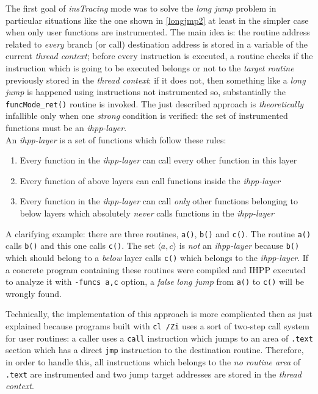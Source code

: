\documentclass[a4paper,10pt]{report}
\begin{document}
The first goal of \emph{insTracing} mode was to solve the \emph{long jump}
problem in particular situations like the one shown in \cref{longjmp2}
at least in the simpler case when only user functions are instrumented.
The main idea is: the routine address related to \emph{every} branch (or call)
destination address is stored in a variable of the current \emph{thread context};
before every instruction is executed, a routine checks if the instruction
which is going to be executed belongs or not to the \emph{target routine}
previously stored in the \emph{thread context}: if it does not, then something
like a \emph{long jump} is happened using instructions not instrumented so,
substantially the \verb|funcMode_ret()| routine is invoked. The just described
approach is \emph{theoretically} infallible only when one \emph{strong} condition
is verified: the set of instrumented functions must be an \emph{ihpp-layer}.\\
An \emph{ihpp-layer} is a set of functions which follow these rules:
\begin{enumerate}
\item Every function in the \emph{ihpp-layer} can call every other function in this layer
\item Every function of above layers can call functions inside the \emph{ihpp-layer}
\item Every function in the \emph{ihpp-layer} can call \emph{only} other functions
belonging to below layers which absolutely \emph{never} calls functions
in the \emph{ihpp-layer}
\end{enumerate}

\noindent
A clarifying example: there are three routines, \verb|a()|, \verb|b()| and \verb|c()|.
The routine \verb|a()| calls \verb|b()| and this one calls \verb|c()|.
The set $\langle a,c\rangle$ is \emph{not} an \emph{ihpp-layer} because \verb|b()| which should belong to a \emph{below} layer calls \verb|c()| which belongs to the \emph{ihpp-layer}. If a concrete program containing these routines were compiled and IHPP executed
to analyze it with \verb|-funcs a,c| option, a \emph{false} \emph{long jump} from
\verb|a()| to \verb|c()| will be wrongly found.

Technically, the implementation of this approach is more complicated then
as just explained because programs built with \verb|cl /Zi| uses
a sort of two-step call system for user routines:
a caller uses a \verb|call| instruction which jumps to
an area of \verb|.text| section which has a direct \verb|jmp| instruction
to the destination routine. Therefore, in order to handle this, all
instructions which belongs to the \emph{no routine area} of \verb|.text| are instrumented
and two jump target addresses are stored in the \emph{thread context}.
\end{document}
